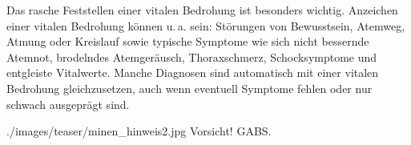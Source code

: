  {%
Das rasche Feststellen einer vitalen Bedrohung ist besonders wichtig. Anzeichen
einer vitalen Bedrohung können u.\,a. sein: Störungen von Be\-wusstsein, Atemweg,
Atmung oder Kreislauf sowie typische Symptome wie sich nicht bessernde Atemnot,
brodelndes Atem\-ge\-räusch, Thoraxschmerz, Schocksymptome und entgleiste
Vital\-werte. Manche Diagnosen sind automatisch mit einer vitalen Bedrohung
gleichzusetzen, auch wenn eventuell Symptome fehlen oder nur schwach ausgeprägt
sind.

}{\vspace{1em}

}{./images/teaser/minen_hinweis2.jpg}
{Vorsicht!}
{GABS.}


